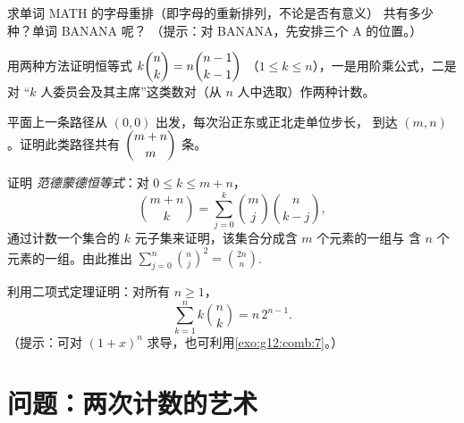\begin{exercise}[$\star\star$]\label{exo:g12:comb:6}
求单词 MATH 的字母重排（即字母的重新排列，不论是否有意义）
共有多少种？单词 BANANA 呢？
（提示：对 BANANA，先安排三个 A 的位置。）
\end{exercise}

\begin{exercise}[$\star\star$]\label{exo:g12:comb:7}
用两种方法证明恒等式 $k\dbinom{n}{k} = n\dbinom{n-1}{k-1}$
（$1 \leq k \leq n$），一是用阶乘公式，二是对
“$k$ 人委员会及其主席”这类数对（从 $n$ 人中选取）作两种计数。
\end{exercise}

\begin{exercise}[$\star\star$]\label{exo:g12:comb:8}
平面上一条路径从 $(0,0)$ 出发，每次沿正东或正北走单位步长，
到达 $(m, n)$。证明此类路径共有 $\dbinom{m+n}{m}$ 条。
\end{exercise}

\begin{exercise}[$\star\star\star$]\label{exo:g12:comb:9}
证明 \emph{范德蒙德恒等式}：对 $0 \leq k \leq m + n$，
\[
\binom{m+n}{k} = \sum_{j=0}^{k} \binom{m}{j}\binom{n}{k-j},
\]
通过计数一个集合的 $k$ 元子集来证明，该集合分成含 $m$ 个元素的一组与
含 $n$ 个元素的一组。由此推出
$\displaystyle\sum_{j=0}^{n}\binom{n}{j}^{\!2} = \binom{2n}{n}$.
\end{exercise}

\begin{exercise}[$\star\star\star$]\label{exo:g12:comb:10}
利用二项式定理证明：对所有 $n \geq 1$，
\[
\sum_{k=1}^{n} k \binom{n}{k} = n\,2^{n-1}.
\]
（提示：可对 $(1+x)^n$ 求导，也可利用\cref{exo:g12:comb:7}。）
\end{exercise}

\section{问题：两次计数的艺术}

